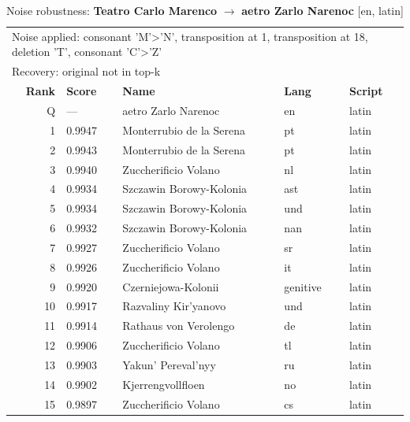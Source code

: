 \begin{table}[htbp]
\centering
\small
\caption{Noise robustness: \textbf{Teatro Carlo Marenco} $\rightarrow$ \textbf{aetro Zarlo Narenoc} [en, latin]}
\label{tab:noise-7}
\begin{tabular}{rllll}
\toprule
\multicolumn{5}{l}{\small Noise applied: consonant 'M'>'N', transposition at 1, transposition at 18, deletion 'T', consonant 'C'>'Z'} \\
\multicolumn{5}{l}{\small Recovery: original not in top-k} \\
\midrule
\textbf{Rank} & \textbf{Score} & \textbf{Name} & \textbf{Lang} & \textbf{Script} \\
\midrule
\rowcolor{gray!20} Q & --- & aetro Zarlo Narenoc & en & latin \\
\midrule
1 & 0.9947 & Monterrubio de la Serena & pt & latin \\
2 & 0.9943 & Monterrubio de la Serena & pt & latin \\
3 & 0.9940 & Zuccherificio Volano & nl & latin \\
4 & 0.9934 & Szczawin Borowy-Kolonia & ast & latin \\
5 & 0.9934 & Szczawin Borowy-Kolonia & und & latin \\
6 & 0.9932 & Szczawin Borowy-Kolonia & nan & latin \\
7 & 0.9927 & Zuccherificio Volano & sr & latin \\
8 & 0.9926 & Zuccherificio Volano & it & latin \\
9 & 0.9920 & Czerniejowa-Kolonii & genitive & latin \\
10 & 0.9917 & Razvaliny Kir'yanovo & und & latin \\
11 & 0.9914 & Rathaus von Verolengo & de & latin \\
12 & 0.9906 & Zuccherificio Volano & tl & latin \\
13 & 0.9903 & Yakun' Pereval'nyy & ru & latin \\
14 & 0.9902 & Kjerrengvollfloen & no & latin \\
15 & 0.9897 & Zuccherificio Volano & cs & latin \\
\bottomrule
\end{tabular}
\end{table}

